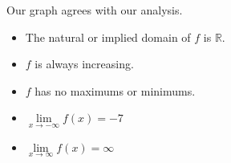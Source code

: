 \documentclass{ximera}
\begin{document}
\begin{example}
\begin{explanation}
Our graph agrees with our analysis.

\begin{itemize}
\item The natural or implied domain of $f$ is $\mathbb{R}$.
\item $f$ is always increasing.
\item $f$ has no maximums or minimums.
\item $\lim\limits_{x \to -\infty} f(x) = -7$
\item $\lim\limits_{x \to \infty} f(x) = \infty$
\end{itemize}




\end{explanation}

\end{example}
\end{document}
